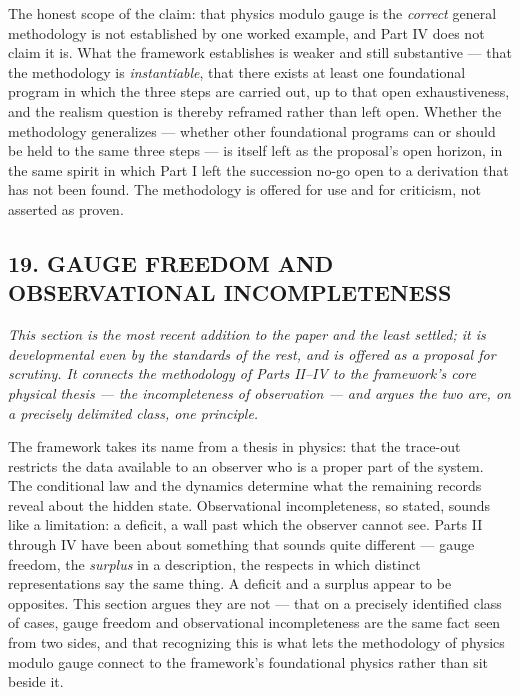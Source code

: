 \documentclass[
]{article}
\begin{document}
The honest scope of the claim: that physics modulo gauge is the
\emph{correct} general methodology is not established by one worked
example, and Part IV does not claim it is. What the framework
establishes is weaker and still substantive --- that the methodology is
\emph{instantiable}, that there exists at least one foundational program
in which the three steps are carried out, up to that open
exhaustiveness, and the realism question is thereby reframed rather than
left open. Whether the methodology generalizes --- whether other
foundational programs can or should be held to the same three steps ---
is itself left as the proposal's open horizon, in the same spirit in
which Part I left the succession no-go open to a derivation that has not
been found. The methodology is offered for use and for criticism, not
asserted as proven.

\hypertarget{gauge-freedom-and-observational-incompleteness}{%
\subsection{19. GAUGE FREEDOM AND OBSERVATIONAL
INCOMPLETENESS}\label{gauge-freedom-and-observational-incompleteness}}

\emph{This section is the most recent addition to the paper and the
least settled; it is developmental even by the standards of the rest,
and is offered as a proposal for scrutiny. It connects the methodology
of Parts II--IV to the framework's core physical thesis --- the
incompleteness of observation --- and argues the two are, on a precisely
delimited class, one principle.}

The framework takes its name from a thesis in physics: that the
trace-out restricts the data available to an observer who is a proper
part of the system. The conditional law and the dynamics determine what
the remaining records reveal about the hidden state. Observational
incompleteness, so stated, sounds like a limitation: a deficit, a wall
past which the observer cannot see. Parts II through IV have been about
something that sounds quite different --- gauge freedom, the
\emph{surplus} in a description, the respects in which distinct
representations say the same thing. A deficit and a surplus appear to be
opposites. This section argues they are not --- that on a precisely
identified class of cases, gauge freedom and observational
incompleteness are the same fact seen from two sides, and that
recognizing this is what lets the methodology of physics modulo gauge
connect to the framework's foundational physics rather than sit beside
it.
\end{document}
